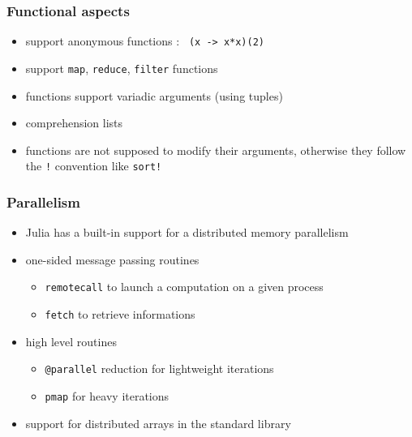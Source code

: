 \documentclass[11pt,mathserif]{beamer}
\newcommand{\julia}{{ Julia}{} }
\begin{document}
\begin{frame}[fragile]
\frametitle{Functional aspects}
\begin{itemize}[<+->]
   \item support anonymous functions : \texttt{ (x -> x*x)(2) }
   \item support \texttt{map}, \texttt{reduce}, \texttt{filter} functions
   \item functions support variadic arguments (using tuples)
   \item comprehension lists
   \item functions are not supposed to modify their arguments, otherwise
   they follow the \texttt{!} convention like \texttt{sort!}
\end{itemize}
\end{frame}

\begin{frame}[fragile]
\frametitle{Parallelism}
\pause
\begin{itemize}[<+->]
   \item \julia has a built-in support for a distributed memory parallelism
   \item one-sided message passing routines 
       \begin{itemize}
            \item \texttt{remotecall} to launch a computation on a given process 
            \item \texttt{fetch} to retrieve informations 
       \end{itemize}     

   \item  high level routines
       \begin{itemize}
            \item \texttt{@parallel} reduction for lightweight iterations
            \item \texttt{pmap} for heavy iterations
       \end{itemize}     
   \item support for distributed arrays in the standard library 
\end{itemize}
\end{frame}
\end{document}
